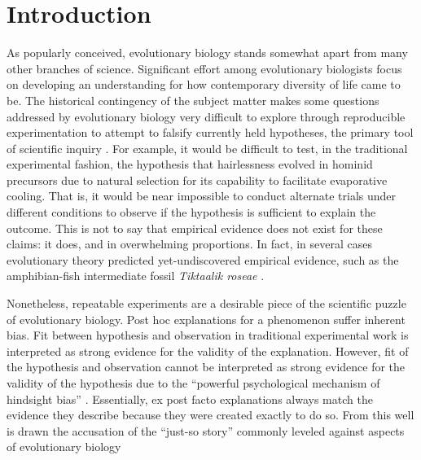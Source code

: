 \section{Introduction} \label{sec:introduction}

As popularly conceived, evolutionary biology stands somewhat apart from many other branches of science.
Significant effort among evolutionary biologists focus on developing an understanding for how contemporary diversity of life came to be.
The historical contingency of the subject matter makes some questions addressed by evolutionary biology very difficult to explore through reproducible experimentation to attempt to falsify currently held hypotheses, the primary tool of scientific inquiry \cite{Smith2016ExplanationsBiology}.
For example, it would be difficult to test, in the traditional experimental fashion, the hypothesis that hairlessness evolved in hominid precursors due to natural selection for its capability to facilitate evaporative cooling.
That is, it would be near impossible to conduct alternate trials under different conditions to observe if the hypothesis is sufficient to explain the outcome.
This is not to say that empirical evidence does not exist for these claims: it does, and in overwhelming proportions.
In fact, in several cases evolutionary theory predicted yet-undiscovered empirical evidence, such as the amphibian-fish intermediate fossil \textit{Tiktaalik roseae} \cite{Daeschler2006APlan}.

Nonetheless, repeatable experiments are a desirable piece of the scientific puzzle of evolutionary biology.
Post hoc explanations for a phenomenon suffer inherent bias.
Fit between hypothesis and observation in traditional experimental work is interpreted as strong evidence for the validity of the explanation.
However, fit of the hypothesis and observation cannot be interpreted as strong evidence for the validity of the hypothesis due to the ``powerful psychological mechanism of hindsight bias'' \cite{Smith2016ExplanationsBiology}.
Essentially, ex post facto explanations always match the evidence they describe because they were created exactly to do so.
From this well is drawn the accusation of the ``just-so story'' commonly leveled against aspects of evolutionary biology \cite{Smith2016ExplanationsBiology}

